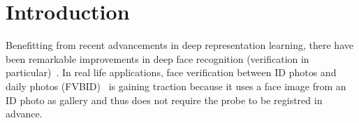 \documentclass[10pt,twocolumn,letterpaper]{article}
\begin{document}
\section{Introduction}\label{sec:intro}






Benefitting from recent advancements in deep representation learning, there have been remarkable improvements in deep face recognition (verification in particular)~\cite{schroff2015facenet,sun2014deep,taigman2014deepface}. In real life applications, face verification between ID photos and daily photos (FVBID)~\cite{zhou2015naive} is gaining traction because it uses a face image from an ID photo as gallery and thus does not require the probe to be registred in advance.


\end{document}

